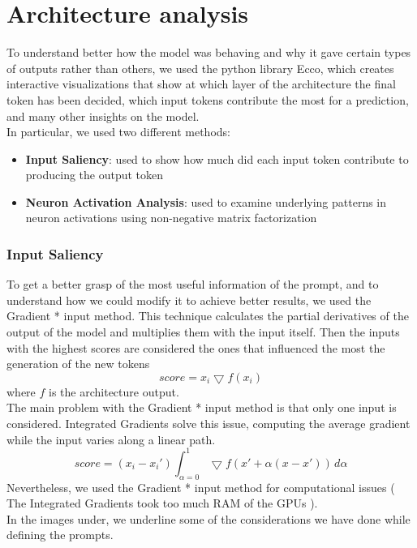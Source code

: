 \section{Architecture analysis}
\label{sec:architecture_analysis}

To understand better how the model was behaving and why it gave certain types of outputs rather than others, we used the python library Ecco\cite{alammar-2021-ecco}, which creates interactive visualizations that show at which layer of the architecture the final token has been decided, which input tokens contribute the most for a prediction, and many other insights on the model. \\
In particular, we used two different methods:
\begin{itemize}
    \item \textbf{Input Saliency}: used to show how much did each input token contribute to producing the output token
    \item \textbf{Neuron Activation Analysis}: used to examine underlying patterns in neuron activations using non-negative matrix factorization
\end{itemize}
\subsubsection*{Input Saliency}
To get a better grasp of the most useful information of the prompt, and to understand how we could modify it to achieve better results, we used the Gradient * input\cite{shrikumar2017learning} method. This technique calculates the partial derivatives of the output of the model and multiplies them with the input itself. Then the inputs with the highest scores are considered the ones that influenced the most the generation of the new tokens
\begin{equation*}
    score = x_i \bigtriangledown f(x_i)
\end{equation*}
where $f$ is the architecture output. \\
The main problem with the Gradient * input method is that only one input is considered. Integrated Gradients\cite{sundararajan2017axiomatic} solve this issue, computing the average gradient while the input varies along a linear path.
\begin{equation*}
    score = (x_i - x_i')\int_{\alpha = 0}^{1} \bigtriangledown f(x' + \alpha(x - x')) \,d\alpha 
\end{equation*}
Nevertheless, we used the Gradient * input method for computational issues ( The Integrated Gradients took too much RAM of the GPUs ).\\
In the images under, we underline some of the considerations we have done while defining the prompts.

